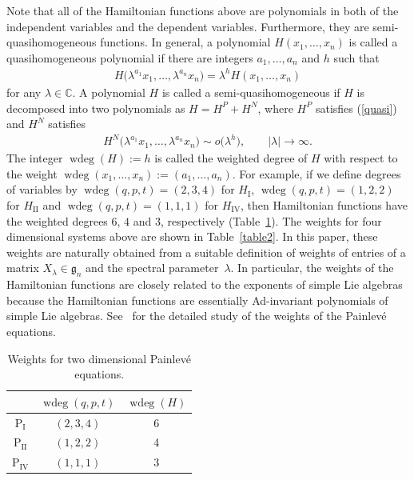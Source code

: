 \documentclass[10pt,a4paper]{amsart}
\numberwithin{equation}{section}
\begin{document}
Note that all of the Hamiltonian functions above are polynomials in both of the independent variables and the dependent variables. Furthermore, they are semi-quasihomogeneous functions. In general, a polynomial $H(x_1, \dots ,x_n)$ is called a quasihomogeneous polynomial if there are integers $a_1, \dots ,a_n$ and $h$ such that
\begin{gather}
H\big(\lambda ^{a_1}x_1 , \dots ,\lambda ^{a_n}x_n\big) = \lambda ^h H(x_1, \dots ,x_n)\label{quasi}
\end{gather}
for any $\lambda \in \mathbb{C}$. A polynomial $H$ is called a semi-quasihomogeneous if $H$ is decomposed into two polynomials as $H = H^P + H^N$, where $H^P$ satisf\/ies (\ref{quasi}) and $H^N$ satisf\/ies
\begin{gather*}
H^N\big(\lambda ^{a_1}x_1 , \dots ,\lambda ^{a_n}x_n\big) \sim o\big(\lambda ^h\big), \qquad |\lambda | \to \infty.
\end{gather*}
The integer $\operatorname{wdeg}(H) := h$ is called the weighted degree of $H$ with respect to the weight $\operatorname{wdeg}(x_1, \dots ,x_n) := (a_1 ,\dots ,a_n)$. For example, if we def\/ine degrees of variables by $\operatorname{wdeg} (q,p,t) = (2,3,4)$ for $H_{\text{I}}$, $\operatorname{wdeg} (q,p,t) = (1,2,2)$ for $H_{\text{II}}$ and $\operatorname{wdeg} (q,p,t) = (1,1,1)$ for $H_{\text{IV}}$, then Hamiltonian functions have the weighted degrees $6$, $4$ and $3$, respectively (Table~\ref{table1}). The weights for four dimensional systems above are shown in Table~\ref{table2}. In this paper, these weights are naturally obtained from a suitable def\/inition of weights of entries of a matrix $X_\lambda \in \mathfrak{g}_n$ and the spectral parameter~$\lambda $. In particular, the weights of the Hamiltonian functions are closely related to the exponents of simple Lie algebras because the Hamiltonian functions are essentially Ad-invariant polynomials of simple Lie algebras. See~\cite{Chi1, Chi2, Chi3} for the detailed study of the weights of the Painlev\'{e} equations.

\begin{table}[h]\centering\caption{Weights for two dimensional Painlev\'{e} equations.}\label{table1}\vspace{1mm}
\begin{tabular}{|c||c|c|}
\hline
 & $\operatorname{wdeg}(q,p,t)$ & $\operatorname{wdeg} (H)$ \\ \hline \hline
$\text{P}_\text{I}$ & $(2,3,4)$ & 6 \\ \hline
$\text{P}_\text{II}$ & $(1,2,2)$ & 4 \\ \hline
$\text{P}_\text{IV}$ & $(1,1,1)$ & 3 \\ \hline
\end{tabular}
\end{table}
\end{document}
